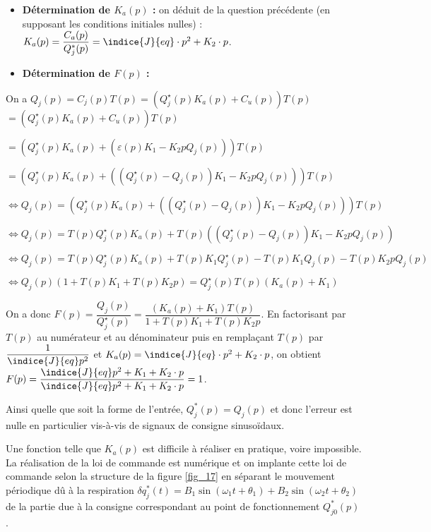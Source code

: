 \begin{corrige}
\begin{itemize}
\item \textbf{Détermination de $K_a(p)$ :} on déduit de la question précédente (en supposant les conditions initiales nulles) : $K_a(p)=\dfrac{C_a(p)}{Q^*_j(p)}=\indice{J}{eq}\cdot p^2+K_2\cdot p$.
\item \textbf{Détermination de $F(p)$ :}
\end{itemize}

On a $Q_j(p) = C_j(p) T(p)= \left( Q_j^{\star}(p) K_a(p) + C_u(p) \right) T(p)$
$= \left( Q_j^{\star}(p) K_a(p) + C_u(p) \right) T(p)$

$= \left( Q_j^{\star}(p) K_a(p) + \left( \varepsilon(p) K_1 - K_2 p Q_j(p) \right)\right) T(p)$

$= \left( Q_j^{\star}(p) K_a(p) + \left( \left(Q_j^{\star}(p) - Q_j(p) \right) K_1 - K_2 p Q_j(p) \right)\right) T(p)$


$\Leftrightarrow Q_j(p) = 
\left(
    Q_j^{\star}(p) K_a(p) + 
    \left( 
        \left(Q_j^{\star}(p) - Q_j(p) \right) K_1 - K_2 p Q_j(p) 
    \right)
\right) T(p)$

$\Leftrightarrow Q_j(p) = 
    T(p)Q_j^{\star}(p) K_a(p) + 
    T(p)\left( 
        \left(Q_j^{\star}(p) - Q_j(p) \right) K_1 - K_2 p Q_j(p) 
    \right) $

$\Leftrightarrow Q_j(p) = 
    T(p)Q_j^{\star}(p) K_a(p) + 
        T(p)K_1 Q_j^{\star}(p) -T(p)K_1  Q_j(p)   - T(p)K_2 p Q_j(p) 
     $

$\Leftrightarrow Q_j(p)\left(1     +T(p)K_1     + T(p)K_2 p\right)= 
      Q_j^{\star}(p)T(p) \left(  K_a(p)     +K_1 \right)     $

On a donc $F(p)=\dfrac{Q_j(p)}{Q_j^{\star}(p)}=\dfrac{\left(K_a(p) +K_1\right)T(p)}{1+T(p)K_1 + T(p)K_2 p}$.
En factorisant par $T(p)$ au numérateur et au dénominateur puis en remplaçant $T(p)$ par $\dfrac{1}{\indice{J}{eq}p^2}$ et $K_a(p)=\indice{J}{eq}\cdot p^2+K_2\cdot p$, on obtient $
F(p)=\dfrac{\indice{J}{eq}p^2+K_1+K_2\cdot p}{\indice{J}{eq}p^2+K_1+K_2\cdot p}=1
$.

Ainsi quelle que soit la forme de l'entrée, $Q^*_j(p)=Q_j(p)$ et donc l'erreur est nulle en particulier vis-à-vis de signaux de consigne sinusoïdaux.
\end{corrige}
\else
\fi

\ifprof
\else
Une fonction telle que $K_{a}(p)$ est difficile à réaliser en pratique, voire impossible. La réalisation de la loi de commande est numérique et on implante cette loi de commande selon la structure de la figure \ref{fig_17} en séparant le mouvement périodique dû à la respiration $\delta q_{j}^{*}(t)=B_{1} \sin \left(\omega_{1} t+\theta_{1}\right)+B_{2} \sin \left(\omega_{2} t+\theta_{2}\right)$ de la partie due à la consigne correspondant au point de fonctionnement $Q_{j 0}^{*}(p)$.
\fi

